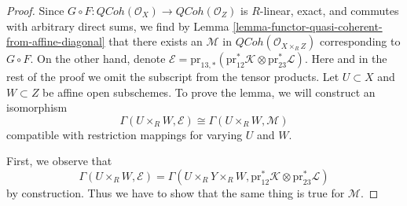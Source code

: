 \documentclass{stacks-project}
\theoremstyle{plain}
\theoremstyle{definition}
\theoremstyle{remark}
\numberwithin{equation}{subsection}
\def\QCoh{\mathit{QCoh}}
\begin{document}
\begin{proof}
Since $G \circ F : \QCoh(\mathcal{O}_X) \to \QCoh(\mathcal{O}_Z)$
is $R$-linear, exact, and commutes with arbitrary direct sums,
we find by Lemma \ref{lemma-functor-quasi-coherent-from-affine-diagonal}
that there exists an $\mathcal{M}$ in
$\QCoh(\mathcal{O}_{X \times_R Z})$ corresponding to $G \circ F$.
On the other hand, denote
$\mathcal{E} = \text{pr}_{13, *}(\text{pr}_{12}^*\mathcal{K}
\otimes \text{pr}_{23}^*\mathcal{L})$. Here and in the rest of
the proof we omit the subscript from the tensor products.
Let $U \subset X$ and $W \subset Z$ be affine open subschemes.
To prove the lemma, we will construct an isomorphism
$$
\Gamma(U \times_R W, \mathcal{E})
\cong
\Gamma(U \times_R W, \mathcal{M})
$$
compatible with restriction mappings for varying $U$ and $W$.

\medskip\noindent
First, we observe that
$$
\Gamma(U \times_R W, \mathcal{E}) =
\Gamma(U \times_R Y \times_R W,
\text{pr}_{12}^*\mathcal{K} \otimes \text{pr}_{23}^*\mathcal{L})
$$
by construction. Thus we have to show that the same thing is true
for $\mathcal{M}$.


\end{proof}
\end{document}
